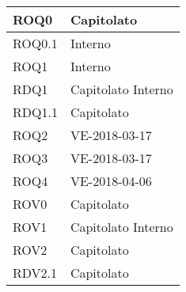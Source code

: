 \documentclass[../AnalisideiRequisiti.tex]{subfiles}
\begin{document}
\begin{longtable}{| p{4cm} | p{4cm} |}
\newline 
ROQ0&\newline Capitolato
\\[1em]
\hline
\newline 
ROQ0.1&\newline Interno
\\[1em]
\hline
\newline 
ROQ1&\newline Interno
\\[1em]
\hline
\newline
RDQ1&\newline Capitolato \newline Interno
\\[1em]
\hline	
\newline
RDQ1.1&\newline Capitolato
\\[1em]
\hline	
\newline
ROQ2&\newline VE-2018-03-17
\\[1em]
\hline	
\newline
ROQ3&\newline VE-2018-03-17
\\[1em]
\hline	
\newline
ROQ4&\newline VE-2018-04-06
\\[1em]
\hline
\newline 
ROV0&\newline Capitolato
\\[1em]
\hline	
\newline 
ROV1&\newline Capitolato \newline Interno
\\[1em]
\hline
\newline 
ROV2&\newline Capitolato
\\[1em]
\hline
\newline
RDV2.1&\newline Capitolato
\\[1em]
\hline
\end{longtable}

\newpage
\end{document}
